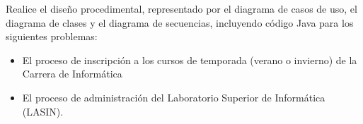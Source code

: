 Realice el diseño procedimental, representado por el diagrama de casos de uso, el diagrama de clases y el diagrama de secuencias, incluyendo código Java para los siguientes problemas:

\begin{itemize}
\item El proceso de inscripción a los cursos de temporada (verano o invierno) de la Carrera de Informática
\item El proceso de administración del Laboratorio Superior de Informática (LASIN).
\end{itemize}
